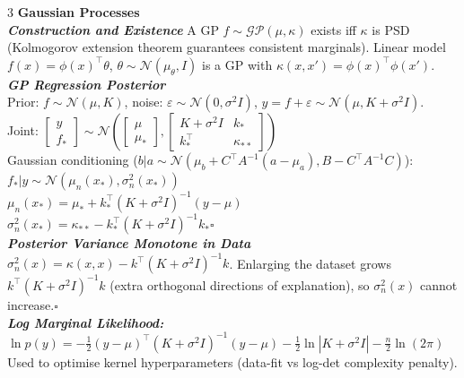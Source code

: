 \documentclass[a4paper,7pt]{article}
\begin{document}
\begin{multicols*}{3}
\textbf{Gaussian Processes}\\

\textit{\textbf{Construction and Existence}} A GP $f\sim\mathcal{GP}(\mu,\kappa)$ exists iff $\kappa$ is PSD (Kolmogorov extension theorem guarantees consistent marginals). Linear model $f(x)=\phi(x)^\top\theta$, $\theta\sim\mathcal{N}(\mu_\theta,I)$ is a GP with $\kappa(x,x')=\phi(x)^\top\phi(x')$.\\

\textit{\textbf{GP Regression Posterior}}\\
Prior: $f\sim\mathcal{N}(\mu,K)$, noise: $\varepsilon\sim\mathcal{N}(0,\sigma^2 I)$, $y=f+\varepsilon\sim\mathcal{N}(\mu,K+\sigma^2 I)$.\\
Joint: $\begin{bmatrix}y\\f_*\end{bmatrix}\sim\mathcal{N}\!\left(\begin{bmatrix}\mu\\\mu_*\end{bmatrix},\begin{bmatrix}K+\sigma^2 I&k_*\\k_*^\top&\kappa_{**}\end{bmatrix}\right)$\\
Gaussian conditioning ($b|a\sim\mathcal{N}(\mu_b+C^\top A^{-1}(a-\mu_a),B-C^\top A^{-1}C)$):\\
$f_*|y\sim\mathcal{N}(\mu_n(x_*),\sigma_n^2(x_*))$\\
$\mu_n(x_*)=\mu_*+k_*^\top(K+\sigma^2 I)^{-1}(y-\mu)$\\
$\sigma_n^2(x_*)=\kappa_{**}-k_*^\top(K+\sigma^2 I)^{-1}k_*$\hfill$\square$\\

\textit{\textbf{Posterior Variance Monotone in Data}}\\
$\sigma_n^2(x)=\kappa(x,x)-k^\top(K+\sigma^2 I)^{-1}k$. Enlarging the dataset grows $k^\top(K+\sigma^2 I)^{-1}k$ (extra orthogonal directions of explanation), so $\sigma_n^2(x)$ cannot increase.\hfill$\square$\\

\textit{\textbf{Log Marginal Likelihood:}} $\ln p(y)=-\frac{1}{2}(y-\mu)^\top(K+\sigma^2 I)^{-1}(y-\mu)-\frac{1}{2}\ln|K+\sigma^2 I|-\frac{n}{2}\ln(2\pi)$\\
Used to optimise kernel hyperparameters (data-fit vs log-det complexity penalty).\\


\end{multicols*}
\end{document}
